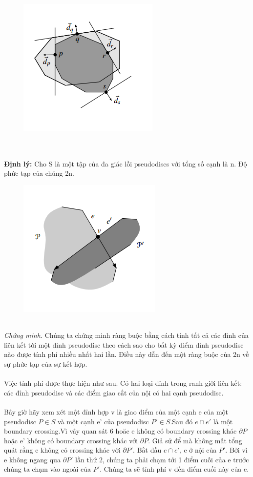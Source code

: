 \documentclass[a4paper,12pt]{report}
\begin{document}
\begin{figure}[h]
\begin{center}
\includegraphics[width=0.4\linewidth]{8.png}
\end{center}
\end{figure}
\\  \\
\textbf{Định lý: }  Cho S là một tập của đa giác lồi pseudodiscs với tổng số cạnh là n. Độ phức tạp của chúng 2n. \\
\begin{figure}[h]
\begin{center}
\includegraphics[width=0.4\linewidth]{9.png}

\end{center}
\end{figure}
\\
\textit{Chứng minh.} Chúng ta chứng minh ràng buộc bằng cách tính tất cả các đỉnh của liên kết tới một đỉnh pseudodisc theo cách sao cho bất kỳ điểm đỉnh pseudodisc nào được tính phí nhiều nhất hai lần. Điều này dẫn đến một ràng buộc của 2n về sự phức tạp của sự kết hợp. \\ \\
Việc tính phí được thực hiện như sau. Có hai loại đỉnh trong ranh giới liên kết: các đỉnh pseudodisc và các điểm giao cắt của nội có hai cạnh pseudodisc. \\ \\
Bây giờ hãy xem xét một đỉnh hợp v là giao điểm của một cạnh e của một pseudodisc $P \in S$ và một cạnh e' của pseudodisc $P' \in S$.Sau đó $e \cap e'$  là một boundary crossing.Vì vây quan sát 6 hoăc e không có boundary crossing khác $\partial P$ hoặc e' không có boundary crossing khác với $\partial P$. Giả sử để mà không mất tổng quát rằng e không có crossing khác với $\partial P'$. Bắt đầu $e \cap e'$, e ở nội của $P'$. Bởi vì e không ngang qua $\partial P'$ lần thứ 2, chúng ta phải chạm tới 1 điểm cuối của e trước chúng ta chạm vào ngoài của $P'$. Chúng ta sẽ tính phí v đến điểm cuối này của e. \\ \\
\end{document}
